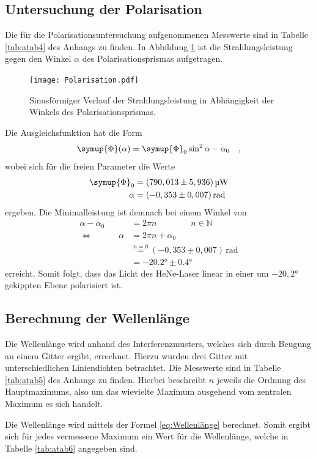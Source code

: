\subsection{Untersuchung der Polarisation}
Die für die Polarisationsuntersuchung aufgenommenen Messwerte sind in Tabelle \ref{tab:atab4} des Anhangs zu finden. 
In Abbildung \ref{fig:afig4} ist die Strahlungsleistung gegen den Winkel $\alpha$ des Polarisationsprismas aufgetragen.
\noindent
\FloatBarrier
\begin{figure}[h]
\centering
\texttt{[image: Polarisation.pdf]}
\caption{Sinusförmiger Verlauf der Strahlungsleistung in Abhängigkeit der Winkels des Polarisationsprismas.}
\label{fig:afig4}
\end{figure}
\FloatBarrier
Die Ausgleichsfunktion hat die Form
\begin{equation}
\symup{\Phi}(\alpha) = \symup{\Phi}_0 \sin^2{\alpha-\alpha_0} \quad ,
\end{equation}
wobei sich für die freien Parameter die Werte
\begin{align}
\symup{\Phi}_0 & = (790,013\pm 5,936)\, \si{\micro\watt}\\
\alpha &= (-0,353\pm 0,007)\, \mathrm{rad}
\end{align}
ergeben. 
Die Minimalleistung ist demnach bei einem Winkel von
\begin{align}
\alpha - \alpha_0 &= 2\pi n \qquad \qquad n \in \mathbb{N} \\
\Leftrightarrow \qquad \quad \alpha &=  2\pi n + \alpha_0 \\
&\stackrel{n = 0}{=} (-0,353\pm 0,007)\, \mathrm{rad} \\
&= -20.2° \pm 0.4°
\end{align}
erreicht. Somit folgt, dass das Licht des HeNe-Laser linear in einer um $-20,2°$ gekippten Ebene polarisiert ist.

\subsection{Berechnung der Wellenlänge}
Die Wellenlänge wird anhand des Interferenzmusters, welches sich durch Beugung an einem Gitter ergibt, errechnet.
Hierzu wurden drei Gitter mit unterschiedlichen Liniendichten betrachtet.
Die Messwerte sind in Tabelle \ref{tab:atab5} des Anhangs zu finden. 
Hierbei beschreibt $n$ jeweils die Ordnung des Hauptmaximums, also um das wievielte Maximum ausgehend vom zentralen Maximum es sich handelt.

Die Wellenlänge wird mittels der Formel \eqref{eq:Wellenlänge} berechnet.
Somit ergibt sich für jedes vermessene Maximum ein Wert für die Wellenlänge, welche in Tabelle \ref{tab:atab6} angegeben sind.

